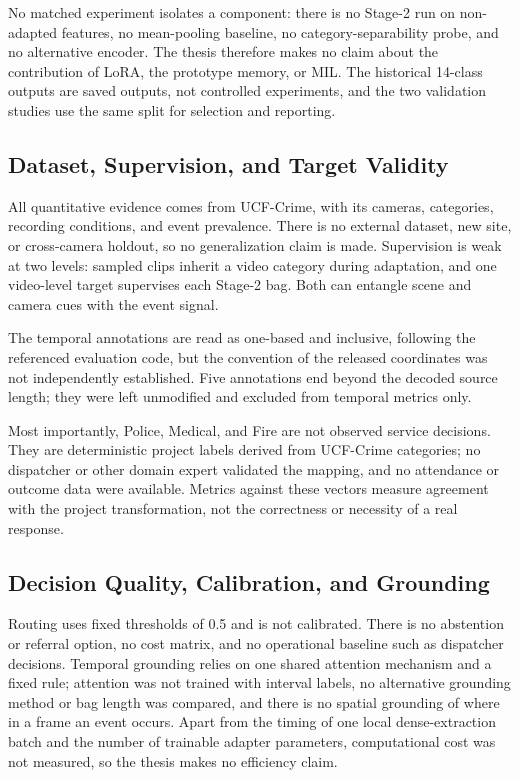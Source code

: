 No matched experiment isolates a component: there is no Stage-2 run on
non-adapted features, no mean-pooling baseline, no category-separability probe,
and no alternative encoder. The thesis therefore makes no claim about the
contribution of LoRA, the prototype memory, or MIL. The historical 14-class
outputs are saved outputs, not controlled experiments, and the two validation
studies use the same split for selection and reporting.

\subsection{Dataset, Supervision, and Target Validity}

All quantitative evidence comes from UCF-Crime, with its cameras, categories,
recording conditions, and event prevalence. There is no external dataset, new
site, or cross-camera holdout, so no generalization claim is made. Supervision is
weak at two levels: sampled clips inherit a video category during adaptation,
and one video-level target supervises each Stage-2 bag. Both can entangle scene
and camera cues with the event signal.

The temporal annotations are read as one-based and inclusive, following the
referenced evaluation code, but the convention of the released coordinates was
not independently established. Five annotations end beyond the decoded source
length; they were left unmodified and excluded from temporal metrics only.

Most importantly, Police, Medical, and Fire are not observed service decisions.
They are deterministic project labels derived from UCF-Crime categories; no
dispatcher or other domain expert validated the mapping, and no attendance or
outcome data were available. Metrics against these vectors measure agreement
with the project transformation, not the correctness or necessity of a real
response.

\subsection{Decision Quality, Calibration, and Grounding}

Routing uses fixed thresholds of 0.5 and is not calibrated. There is no
abstention or referral option, no cost matrix, and no operational baseline such
as dispatcher decisions. Temporal grounding relies on one shared attention
mechanism and a fixed rule; attention was not trained with interval labels, no
alternative grounding method or bag length was compared, and there is no spatial
grounding of where in a frame an event occurs. Apart from the timing of one local dense-extraction batch
and the number of trainable adapter parameters, computational cost was not
measured, so the thesis makes no efficiency claim.

